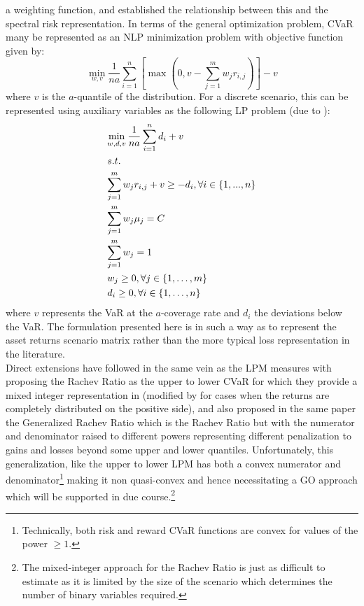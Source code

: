 a weighting function, and established the relationship between this and the
spectral risk representation. In terms of the general optimization problem,
CVaR many be represented as an NLP minimization problem with objective
function given by:
\begin{equation}
\mathop {\min }\limits_{w,v} \frac{1}{na}\sum\limits_{i=1}^n {\left[ {\max \left( {0,v - \sum\limits_{j=1}^m {{w_j}{r_{i,j}}} } \right)} \right] - v}
\end{equation}
where $v$ is the $a$-quantile of the distribution. For a discrete scenario,
this can be represented using auxiliary variables as the following LP problem
(due to ):
\begin{equation}
\begin{gathered}
  \mathop {\min }\limits_{w,d,v} \frac{1}{{na}}\sum\limits_{i=1}^n {{d_i} + v}  \hfill \\
  s.t. \hfill \\
  \sum\limits_{j=1}^m {{w_j}{r_{i,j}} + v}  \geq  - {d_i},\forall i \in \left\{ {1,...,n} \right\} \hfill \\
  \sum\limits_{j=1}^m {{w_j}{\mu _j}=C}  \hfill \\
  \sum\limits_{j=1}^m {{w_j}=1}  \hfill \\
  {w_j} \geq 0,\forall j \in \left\{ {1,\dots,m} \right\} \hfill \\
  {d_i} \geq 0,\forall i \in \left\{ {1,\dots,n} \right\} \hfill \\
\end{gathered}
\end{equation}
where $v$ represents the VaR at the $a$-coverage rate and $d_i$ the
deviations  below the VaR. The formulation presented here is in such a way
as to represent the asset returns scenario matrix rather than the more typical
loss representation in the literature.\\
Direct extensions have followed in the same vein as the LPM measures with
 proposing the Rachev Ratio as the upper to lower
CVaR for which they provide a mixed integer representation in
 (modified by  for cases when
the returns are completely distributed on the positive side), and also
proposed in the same paper the Generalized Rachev Ratio which is the Rachev
Ratio but with the numerator and denominator raised to different powers
representing different penalization to gains and losses beyond some upper and
lower quantiles. Unfortunately, this generalization, like the upper to lower
LPM has both a convex numerator and denominator\footnote{Technically, both
risk and reward CVaR functions are convex for values of the power $\ge 1$.}
making it non quasi-convex and hence necessitating a GO approach which will
be supported in due course.\footnote{The mixed-integer approach for the
Rachev Ratio is just as difficult to estimate as it is limited by the size of
the scenario which determines the number of binary variables required.}

